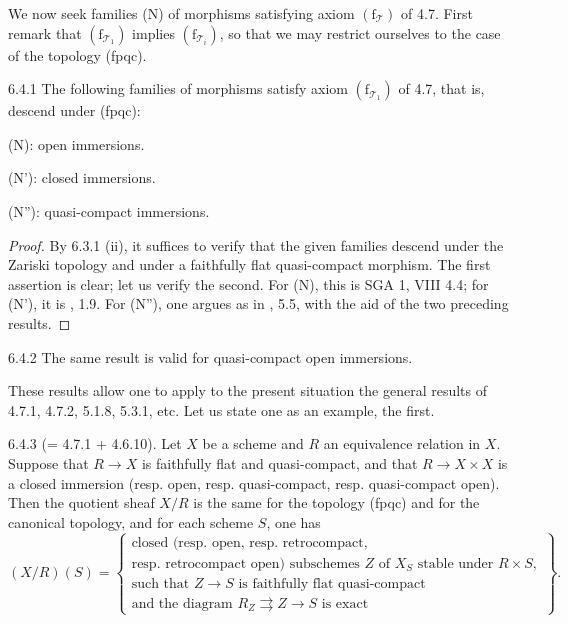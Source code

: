 We now seek families (N) of morphisms
satisfying axiom \((\mathrm f_{\mathcal T})\)
of 4.7. First remark that
\((\mathrm f_{\mathcal T_1})\) implies
\((\mathrm f_{\mathcal T_i})\), so that
we may restrict ourselves to the case
of the topology (fpqc).
\begin{lemma}{6.4.1}\label{IV.6.4.1}
The following families of morphisms satisfy
axiom \((\mathrm f_{\mathcal T_1})\) of 4.7,
that is, \og descend under (fpqc)\fg:

(N): open immersions.

(N'): closed immersions.

(N''): quasi-compact immersions.
\end{lemma}
\begin{proof}
By 6.3.1 (ii), it suffices to verify that
the given families descend under the
Zariski topology and under a faithfully
flat quasi-compact morphism.
The first assertion is clear; let us
verify the second. For (N), this is
SGA 1, VIII 4.4; for (N'), it is
\loccit, 1.9. For (N''), one argues
as in \loccit, 5.5, with the aid of
the two preceding results.
\end{proof}
\begin{corollary}{6.4.2}\label{IV.6.4.2}
The same result is valid for quasi-compact open immersions.
\end{corollary}
These results allow one to apply to
the present situation the general
results of 4.7.1, 4.7.2, 5.1.8,
5.3.1, etc. Let us state one as an
example, the first.
\begin{corollary}{6.4.3}\label{IV.6.4.3}
\textup{(= 4.7.1 + 4.6.10).}
Let \(X\) be a scheme and \(R\)
an equivalence relation in \(X\).
Suppose that \(R\to X\) is faithfully
flat and quasi-compact, and that
\(R\to X\times X\) is a closed
immersion (resp. open, resp. quasi-compact,
resp. quasi-compact open).
Then the quotient sheaf \(X/R\)
is the same for the topology (fpqc)
and for the canonical topology,
and for each scheme \(S\), one has
\[
(X/R)(S)=\left\{\begin{array}{l}
\text{closed (resp. open, resp. retrocompact,}\\
\text{resp. retrocompact open) subschemes }Z
\text{ of }X_S\text{ stable under }R\times S,\\
\text{such that }Z\to S\text{ is faithfully flat quasi-compact}\\
\text{and the diagram }R_Z\rightrightarrows Z\to S\text{ is exact}
\end{array}\right\}.
\]
\end{corollary}

